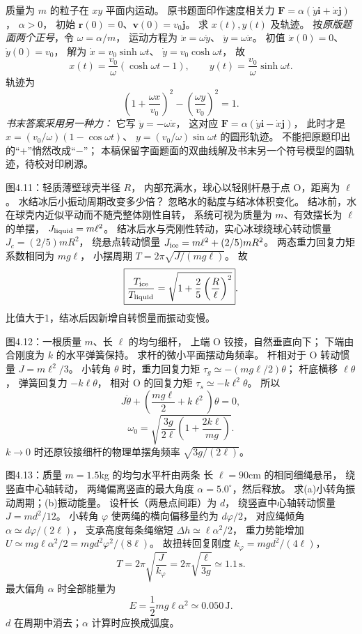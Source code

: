 质量为 $m$ 的粒子在 $xy$ 平面内运动。
原书题面印作速度相关力
$\bm F=\alpha(\dot y\bm i+\dot x\bm j)$，
$\alpha>0$，
初始 $\bm r(0)=0$、$\bm v(0)=v_0\bm j$。
求 $x(t),y(t)$ 及轨迹。
\exsolution
按\emph{原版题面两个正号}，令
$\omega=\alpha/m$，
运动方程为
$\ddot x=\omega\dot y$、
$\ddot y=\omega\dot x$。
初值 $\dot x(0)=0$、$\dot y(0)=v_0$，
解为
$\dot x=v_0\sinh\omega t$、
$\dot y=v_0\cosh\omega t$，
故
\[
\boxed{x(t)=\frac{v_0}{\omega}
(\cosh\omega t-1),\qquad
y(t)=\frac{v_0}{\omega}\sinh\omega t}.
\]
轨迹为
\[
\boxed{\left(1+\frac{\omega x}{v_0}\right)^2-
\left(\frac{\omega y}{v_0}\right)^2=1}.
\]
\emph{书末答案采用另一种力：}
它写
$\ddot y=-\omega\dot x$，
这对应
$\bm F=\alpha(\dot y\bm i-\dot x\bm j)$，
此时才是
$x=(v_0/\omega)(1-\cos\omega t)$、
$y=(v_0/\omega)\sin\omega t$
的圆形轨迹。
\excheck 不能把原题印出的“$+$”悄然改成“$-$”；
本稿保留字面题面的双曲线解及书末另一个符号模型的圆轨迹，待校对印刷源。

图4.11：轻质薄壁球壳半径 $R$，
内部充满水，球心以轻刚杆悬于点 O，距离为 $\ell$。
水结冰后小振动周期改变多少倍？
忽略水的黏度与结冰体积变化。
\exsolution
结冰前，水在球壳内近似平动而不随壳整体刚性自转，
系统可视为质量为 $m$、有效摆长为 $\ell$ 的单摆，
$J_{\rm liquid}=m\ell^2$。
结冰后水与壳刚性转动，实心冰球绕球心转动惯量
$J_c=(2/5)mR^2$，
绕悬点转动惯量
$J_{\rm ice}=m\ell^2+(2/5)mR^2$。
两态重力回复力矩系数相同为 $mg\ell$，
小摆周期 $T=2\pi\sqrt{J/(mg\ell)}$。
故
\[
\boxed{\frac{T_{\rm ice}}{T_{\rm liquid}}
=\sqrt{1+\frac25\left(\frac R\ell\right)^2}}.
\]
\excheck 比值大于1，结冰后因新增自转惯量而振动变慢。

图4.12：一根质量 $m$、长 $\ell$ 的均匀细杆，
上端 O 铰接，自然垂直向下；
下端由合刚度为 $k$ 的水平弹簧保持。
求杆的微小平面摆动角频率。
\exsolution
杆相对于 O 转动惯量
$J=m\ell^2/3$。
小转角 $\theta$ 时，重力回复力矩
$\tau_g\simeq-(mg\ell/2)\theta$；
杆底横移 $\ell\theta$，
弹簧回复力 $-k\ell\theta$，
相对 O 的回复力矩
$\tau_s\simeq-k\ell^2\theta$。
所以
\[
J\ddot\theta+
\left(\frac{mg\ell}{2}+k\ell^2\right)\theta=0,
\]
\[
\boxed{\omega_0=
\sqrt{\frac{3g}{2\ell}
\left(1+\frac{2k\ell}{mg}\right)}}.
\]
\excheck $k\to0$ 时还原铰接细杆的物理单摆角频率 $\sqrt{3g/(2\ell)}$。

图4.13：质量 $m=1.5$kg 的均匀水平杆由两条
长 $\ell=90$cm 的相同细绳悬吊，
绕竖直中心轴转动，
两绳偏离竖直的最大角度
$\alpha=5.0^\circ$，然后释放。
求(a)小转角振动周期；(b)振动能量。
\exsolution
设杆长（两悬点间距）为 $d$，
绕竖直中心轴转动惯量
$J=md^2/12$。
小转角 $\varphi$ 使两绳的横向偏移量约为 $d\varphi/2$，
对应绳倾角 $\alpha\simeq d\varphi/(2\ell)$，
支承高度每条绳缩短
$\Delta h\simeq\ell\alpha^2/2$，
重力势能增加
$U\simeq mg\ell\alpha^2/2
=mgd^2\varphi^2/(8\ell)$。
故扭转回复刚度 $k_\varphi=mgd^2/(4\ell)$，
\[
\boxed{T=2\pi\sqrt{\frac{J}{k_\varphi}}
=2\pi\sqrt{\frac{\ell}{3g}}
\simeq1.1\,\mathrm s}.
\]
最大偏角 $\alpha$ 时全部能量为
\[
\boxed{E=\frac12mg\ell\alpha^2
\simeq0.050\,\mathrm J}.
\]
\excheck $d$ 在周期中消去；$\alpha$ 计算时应换成弧度。

